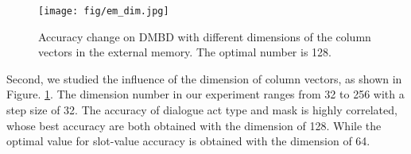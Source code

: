 \begin{figure}
  \texttt{[image: fig/em\_dim.jpg]}
  \caption{Accuracy change on DMBD with different dimensions of the column vectors in the external memory. The optimal number is 128.
  }
  \label{fig:dimension}
\end{figure}


Second, we studied the influence of the dimension of column vectors, as shown in Figure. \ref{fig:dimension}. The dimension number in our experiment ranges from 32 to 256 with a step size of 32. The accuracy of dialogue act type and mask is highly correlated, whose best accuracy are both obtained with the dimension of 128. While the optimal value for slot-value accuracy is obtained with the dimension of 64.




